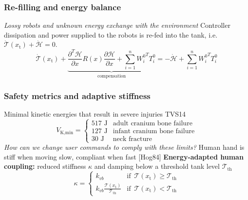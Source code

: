 \documentclass[student]{ITRslides}
\newcommand{\g}[1]{\text{#1}}
\begin{document}
\begin{frame}
	\frametitle{Re-filling and energy balance}
	\begin{figure}[b!]
		\centering
		\footnotesize
		\def\svgwidth{0.95\columnwidth}
						
	\end{figure}
	\textit{Lossy robots and unknown energy exchange with the environment}
	Controller dissipation and power supplied to the robots is re-fed into the tank, i.e. $\dot{\mathcal{T}}(x_\g{t})+\dot{\mathcal{H}}=0$.
	\[
	\dot{\mathcal{T}}(x_\g{t}) + \underbrace{\frac{\partial^T \mathcal{H}}{\partial x}R(x)\frac{\partial \mathcal{H}}{\partial x} + \sum_{i=1}^n {W_i^{0}}^T T_i^0}_{\text{compensation}} = - \dot{{\mathcal{H}}} + \sum_{i=1}^n {W_i^{0}}^T T_i^0
	\] 
\end{frame}

\begin{frame}
	\frametitle{Safety metrics and adaptive stiffness}
	Minimal kinetic energies that result in severe injuries \nocite{Tadele_14}{\tiny TVS14}
	\[
	V_{\g{K,min}} = 
	\begin{cases}
	517 \text{ J} & \text{adult cranium bone failure} \\
	127 \text{ J} & \text{infant cranium bone failure} \\
	30 \text{ J} & \text{neck fracture}
	\end{cases}
	\]
	\textit{How can we change user commands to comply with these limits?}
	Human hand is stiff when moving slow, compliant when fast \nocite{Hogan_84b}{\tiny [Hog84]}
	\textbf{Energy-adapted human coupling:} reduced stiffness $\kappa$ and damping below a threshold tank level $\mathcal{T}_{\g{th}}$
	\[
	\kappa = \begin{cases}
	k_{vb} & \text{if } \, \mathcal{T}(x_\g{t})\geq \mathcal{T}_{\g{th}} \\
	k_{vb} \frac{\mathcal{T}(x_\g{t})}{\mathcal{T}_{\g{th}}} & \text{if } \, \mathcal{T}(x_\g{t}) < \mathcal{T}_{\g{th}}
	\end{cases} \]
	\end{frame}
\end{document}
